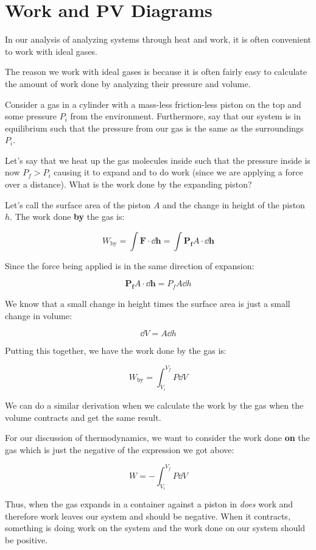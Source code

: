 \documentclass{report}
\begin{document}
\section{Work and PV Diagrams}
In our analysis of analyzing systems through heat and work, it is often convenient to work with ideal gases. 

The reason we work with ideal gases is because it is often fairly easy to calculate the amount of work done by analyzing their pressure and volume.

Consider a gas in a cylinder with a mass-less friction-less piston on the top and some pressure $P_i$ from the environment. Furthermore, say that our system is in equilibrium such that the pressure from our gas is the same as the surroundings $P_i$. 

Let's say that we heat up the gas molecules inside such that the pressure inside is now $P_f > P_i$ causing it to expand and to do work (since we are applying a force over a distance). What is the work done by the expanding piston?

Let's call the surface area of the piston $A$ and the change in height of the piston $h$. The work done \textbf{by} the gas is:

$$W_{\text{by}} = \int{\mathbf{F} \cdot \dd \mathbf{h}} = \int{\mathbf{P_f}A \cdot \dd \mathbf{h}} $$

Since the force being applied is in the same direction of expansion:

$$\mathbf{P_f}A \cdot \dd \mathbf{h} =P_f A\dd h $$

We know that a small change in height times the surface area is just a small change in volume:

$$\dd V = A \dd h$$

Putting this together, we have the work done by the gas is:

$$W_{\text{by}} = \int_{V_i}^{V_f} P \dd V$$

We can do a similar derivation when we calculate the work by the gas when the volume contracts and get the same result.

For our discussion of thermodynamics, we want to consider the work done \textbf{on} the gas which is just the negative of the expression we got above:

$$\boxed{
W = -\int_{V_i}^{V_f} P \dd V
}$$

Thus, when the gas expands in a container against a piston in \textit{does} work and therefore work leaves our system and should be negative. When it contracts, something is doing work on the system and the work done on our system should be positive.
\end{document}
